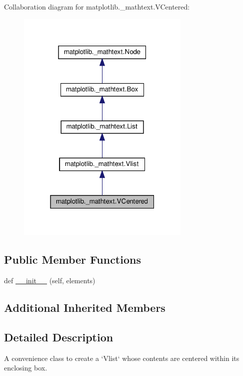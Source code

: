 Collaboration diagram for matplotlib.\+\_\+mathtext.\+V\+Centered\+:
\nopagebreak
\begin{figure}[H]
\begin{center}
\leavevmode
\includegraphics[width=235pt]{classmatplotlib_1_1__mathtext_1_1VCentered__coll__graph}
\end{center}
\end{figure}
\subsection*{Public Member Functions}
\begin{DoxyCompactItemize}
\item 
def \hyperlink{classmatplotlib_1_1__mathtext_1_1VCentered_ab797cc5814e01062a925479f8decad6a}{\+\_\+\+\_\+init\+\_\+\+\_\+} (self, elements)
\end{DoxyCompactItemize}
\subsection*{Additional Inherited Members}


\subsection{Detailed Description}
\begin{DoxyVerb}A convenience class to create a `Vlist` whose contents are
centered within its enclosing box.
\end{DoxyVerb}
 

